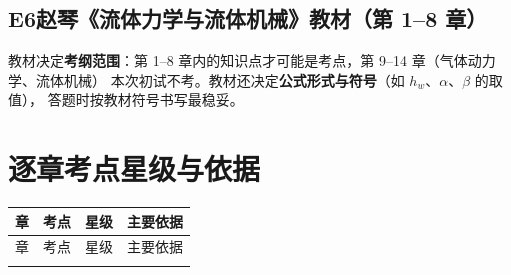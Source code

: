 \subsection*{E6\quad 赵琴《流体力学与流体机械》教材（第 1--8 章）}

\noindent 教材决定\textbf{考纲范围}：第 1--8 章内的知识点才可能是考点，第 9--14 章（气体动力学、流体机械）
本次初试不考。教材还决定\textbf{公式形式与符号}（如 $h_w$、$\alpha$、$\beta$ 的取值），
答题时按教材符号书写最稳妥。

\section{逐章考点星级与依据}
\label{sec:apA-tab}

{\small\setlength{\tabcolsep}{4pt}%
\begin{longtable}{@{}p{}p{}cp{}@{}}
\toprule
章 & 考点 & 星级 & 主要依据 \\
\midrule
\endfirsthead
\toprule
章 & 考点 & 星级 & 主要依据 \\
\midrule
\endhead
\bottomrule
\endlastfoot


\end{longtable}}
